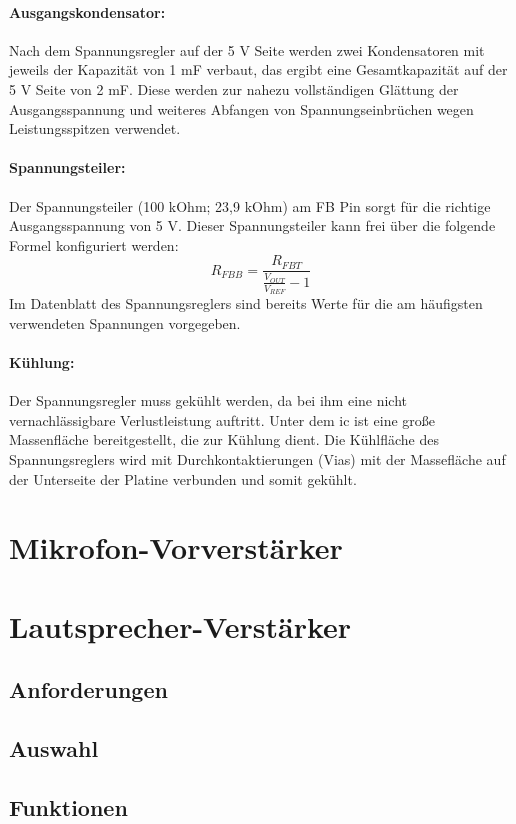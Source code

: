 \paragraph{Ausgangskondensator:}
Nach dem Spannungsregler auf der 5 V Seite werden zwei Kondensatoren mit jeweils der Kapazität von 1 mF verbaut, das ergibt eine Gesamtkapazität auf der 5 V Seite von 2 mF.
Diese werden zur nahezu vollständigen Glättung der Ausgangsspannung und weiteres Abfangen von Spannungseinbrüchen wegen Leistungsspitzen verwendet.

\paragraph{Spannungsteiler:}
Der Spannungsteiler (100 kOhm; 23,9 kOhm) am FB Pin sorgt für die richtige Ausgangsspannung von 5 V.
Dieser Spannungsteiler kann frei über die folgende Formel konfiguriert werden:
\[R_{FBB}=\frac{R_{FBT}}{\frac{V_{OUT}}{V_{REF}}-1}\]
Im Datenblatt des Spannungsreglers sind bereits Werte für die am häufigsten verwendeten Spannungen vorgegeben.

\paragraph{Kühlung:}
Der Spannungsregler muss gekühlt werden, da bei ihm eine nicht vernachlässigbare Verlustleistung auftritt.
Unter dem \ac{ic} ist eine große Massenfläche bereitgestellt, die zur Kühlung dient.
Die Kühlfläche des Spannungsreglers wird mit Durchkontaktierungen (Vias) mit der Massefläche auf der Unterseite der Platine verbunden und somit gekühlt.

\section{Mikrofon-Vorverstärker}

\section{Lautsprecher-Verstärker}
\subsection{Anforderungen}
\subsection{Auswahl}
\subsection{Funktionen}
